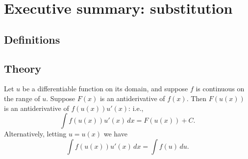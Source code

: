 \newpage

\section{Executive summary: substitution}

\thispagestyle{fancy}
\subsection*{Definitions}



 \subsection*{Theory}

\begin{namedtheorem} Let $u$ be a differentiable function on its domain, and suppose $f$ is continuous on the range of $u$. Suppose $F(x)$ is an antiderivative of $f(x)$. Then $F(u(x))$ is an antiderivative of $f(u(x))u'(x)$: i.e.,
  \[
  \int f(u(x))u'(x)\, dx=F(u(x))+C.
  \]
  Alternatively, letting $u=u(x)$ we have
  \[
  \int f(u(x))u'(x)\, dx=\int f(u)\, du.
  \]
\end{namedtheorem}
\begin{comment}
Before seeing how to correctly use the chain rule (antiderivative version) to compute indefinite integrals, it is worthwhile noting a tempting, but {\em incorrect} method: namely, if $F(x)$ is an antiderivative of $f(x)$ it is not in general true that $F(u(x))$ is an antiderivative of $f(u(x))$. Indeed, the chain rule tells us that $F(u(x))$ is an antiderivative of $f(u(x))u'(x)$.

\end{comment}


